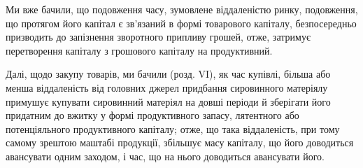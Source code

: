 Ми вже бачили, що подовження часу, зумовлене віддаленістю ринку,
подовження, що протягом його капітал є зв’язаний в формі товарового
капіталу, безпосередньо призводить до запізнення зворотного припливу
грошей, отже, затримує перетворення капіталу з грошового капіталу на
продуктивний.

Далі, щодо закупу товарів, ми бачили (розд. VI), як час купівлі,
більша або менша віддаленість від головних джерел придбання сировинного
матеріялу примушує купувати сировинний матеріял на довші періоди
й зберігати його придатним до вжитку у формі продуктивного запасу, лятентного
або потенціяльного продуктивного капіталу; отже, що така
віддаленість, при тому самому зрештою маштабі продукції, збільшує масу
капіталу, що його доводиться авансувати одним заходом, і час, що на
нього доводиться авансувати його.

